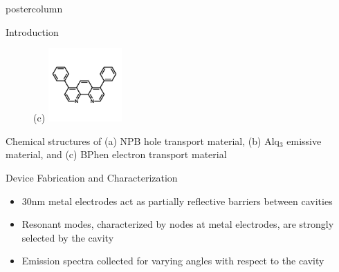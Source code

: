 \documentclass[final]{beamer}
\begin{document}
\begin{frame}
\begin{columns}
\begin{column}{.49\textwidth}
\begin{beamercolorbox}[center,wd=\textwidth]{postercolumn}
\begin{minipage}[T]{.99\textwidth}
{\begin{block}{Introduction}
\begin{figure}
                    (c) \includegraphics[width=0.25\textwidth]{images/bphen_structure.jpg}
                \end{figure}
                \vspace{2cm}
                \centering
                \small Chemical structures of (a) NPB hole transport material, (b) Alq$_3$ emissive material, and (c) BPhen electron transport material
            \end{block}
            \vfill
            \begin{block}{Device Fabrication and Characterization}
                \vspace{2cm}
                \begin{minipage}{0.45\textwidth}
					\begin{itemize}
                     \item 30nm metal electrodes act as partially reflective barriers between cavities \newline
                     \item Resonant modes, characterized by nodes at metal electrodes, are strongly selected by the cavity \newline
                     \item Emission spectra collected for varying angles with respect to the cavity

\end{itemize}
\end{minipage}
\end{block}}
\end{minipage}
\end{beamercolorbox}
\end{column}
\end{columns}
\end{frame}
\end{document}
